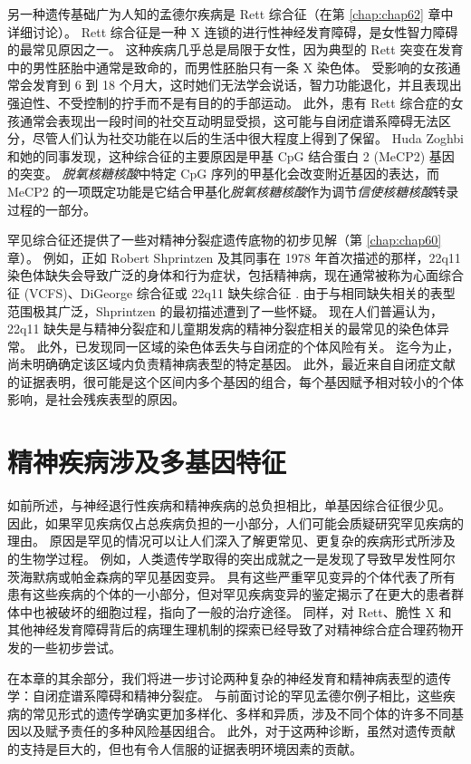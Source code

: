 另一种遗传基础广为人知的孟德尔疾病是 Rett 综合征（在第 \ref{chap:chap62} 章中详细讨论）。 
Rett 综合征是一种 X 连锁的进行性神经发育障碍，是女性智力障碍的最常见原因之一。 
这种疾病几乎总是局限于女性，因为典型的 Rett 突变在发育中的男性胚胎中通常是致命的，而男性胚胎只有一条 X 染色体。 
受影响的女孩通常会发育到 6 到 18 个月大，这时她们无法学会说话，智力功能退化，并且表现出强迫性、不受控制的拧手而不是有目的的手部运动。 
此外，患有 Rett 综合症的女孩通常会表现出一段时间的社交互动明显受损，这可能与自闭症谱系障碍无法区分，尽管人们认为社交功能在以后的生活中很大程度上得到了保留。 
Huda Zoghbi 和她的同事发现，这种综合征的主要原因是甲基 CpG 结合蛋白 2 (MeCP2) 基因的突变。 
\textit{脱氧核糖核酸}中特定 CpG 序列的甲基化会改变附近基因的表达，而 MeCP2 的一项既定功能是它结合甲基化\textit{脱氧核糖核酸}作为调节\textit{信使核糖核酸}转录过程的一部分。


罕见综合征还提供了一些对精神分裂症遗传底物的初步见解（第 \ref{chap:chap60} 章）。 
例如，正如 Robert Shprintzen 及其同事在 1978 年首次描述的那样，22q11 染色体缺失会导致广泛的身体和行为症状，包括精神病，现在通常被称为心面综合征 (VCFS)、DiGeorge 综合征或 22q11 缺失综合征 . 由于与相同缺失相关的表型范围极其广泛，Shprintzen 的最初描述遭到了一些怀疑。 
现在人们普遍认为，22q11 缺失是与精神分裂症和儿童期发病的精神分裂症相关的最常见的染色体异常。 
此外，已发现同一区域的染色体丢失与自闭症的个体风险有关。 
迄今为止，尚未明确确定该区域内负责精神病表型的特定基因。 
此外，最近来自自闭症文献的证据表明，很可能是这个区间内多个基因的组合，每个基因赋予相对较小的个体影响，是社会残疾表型的原因。


\section{精神疾病涉及多基因特征}
如前所述，与神经退行性疾病和精神疾病的总负担相比，单基因综合征很少见。 
因此，如果罕见疾病仅占总疾病负担的一小部分，人们可能会质疑研究罕见疾病的理由。 
原因是罕见的情况可以让人们深入了解更常见、更复杂的疾病形式所涉及的生物学过程。 
例如，人类遗传学取得的突出成就之一是发现了导致早发性阿尔茨海默病或帕金森病的罕见基因变异。 
具有这些严重罕见变异的个体代表了所有患有这些疾病的个体的一小部分，但对罕见疾病变异的鉴定揭示了在更大的患者群体中也被破坏的细胞过程，指向了一般的治疗途径。 
同样，对 Rett、脆性 X 和其他神经发育障碍背后的病理生理机制的探索已经导致了对精神综合症合理药物开发的一些初步尝试。


在本章的其余部分，我们将进一步讨论两种复杂的神经发育和精神病表型的遗传学：自闭症谱系障碍和精神分裂症。 
与前面讨论的罕见孟德尔例子相比，这些疾病的常见形式的遗传学确实更加多样化、多样和异质，涉及不同个体的许多不同基因以及赋予责任的多种风险基因组合。 
此外，对于这两种诊断，虽然对遗传贡献的支持是巨大的，但也有令人信服的证据表明环境因素的贡献。


